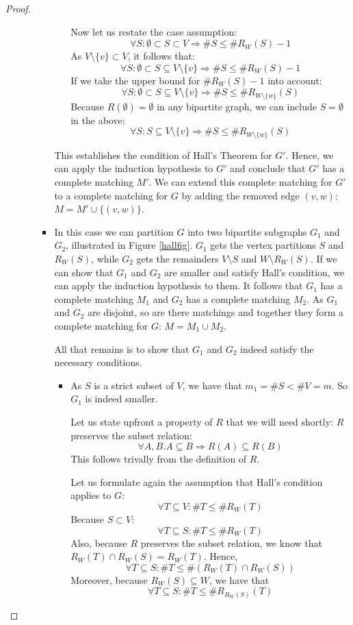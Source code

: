 \begin{proof}
\begin{itemize}
\begin{itemize}
\begin{itemize}
\begin{itemize}
Now let us restate the case assumption:
\[\forall S: \emptyset \subset S \subset V \Rightarrow \#S \leq \#R_W(S) - 1\]
As $V \setminus \{ v \} \subset V$, it follows that:
\[\forall S: \emptyset \subset S \subseteq V\setminus \{ v \} \Rightarrow \#S \leq \#R_W(S) - 1\]
If we take the upper bound for $\#R_W(S) - 1$ into account:
\[\forall S: \emptyset \subset S \subseteq V\setminus \{ v \} \Rightarrow \#S \leq \#R_{W\setminus\{w\}}(S)\]
Because $R(\emptyset) = \emptyset$ in any bipartite graph, we can include $S = \emptyset$ in the above:
\[\forall S: S \subseteq V\setminus \{ v \} \Rightarrow \#S \leq \#R_{W\setminus\{w\}}(S)\]
\end{itemize}
This establishes the condition of Hall's Theorem for $G'$. Hence, we can apply the induction
hypothesis to $G'$ and conclude that $G'$ has a complete matching $M'$. We can extend
this complete matching for $G'$ to a complete matching for $G$ by adding the removed edge $(v,w)$:
$M = M' \cup \{ (v,w)\}$.
 
\item[\dashuline{$\exists S: \emptyset \subset S \subset V \wedge \#S =\#R(S)$:}]
In this case we can partition $G$ into two bipartite subgraphs $G_1$ and $G_2$,
illustrated in Figure \ref{hallfig}. $G_1$ gets the vertex partitions $S$ and $R_W(S)$, 
while $G_2$ gets the remainders $V \setminus S$ and $W \setminus R_W(S)$.
If we can show that $G_1$ and $G_2$ are smaller and satisfy Hall's condition,
we can apply the induction hypothesis to them. It follows that $G_1$
has a complete matching $M_1$ and $G_2$ has a complete matching $M_2$. As $G_1$ 
and $G_2$ are disjoint, so are there matchings and together they
form a complete matching for $G$: $M = M_1 \cup M_2$.

All that remains is to show that $G_1$ and $G_2$ indeed satisfy the necessary
conditions.
\begin{itemize}
\item[\dotuline{$G_1$:}]
As $S$ is a strict subset of $V$, we have that $m_1 = \#S < \#V = m$.
So $G_1$ is indeed smaller.

Let us state upfront a property of $R$ that we will need shortly:
$R$ preserves the subset relation:
\[ \forall A, B. A \subseteq B \Rightarrow R(A) \subseteq R(B) \]
This follows trivally from the definition of $R$.

Let us formulate again the assumption that Hall's condition applies to $G$:
\[ \forall T \subseteq V: \#T \leq \#R_W(T) \]
Because $S \subset V$:
\[ \forall T \subseteq S: \#T \leq \#R_W(T) \]
Also, because $R$ preserves the subset relation, 
we know that $R_W(T) \cap R_W(S) = R_W(T)$. Hence,
\[ \forall T \subseteq S: \#T \leq \#(R_W(T) \cap R_W(S)) \]
Moreover, because $R_W(S) \subseteq W$, we have that
\[ \forall T \subseteq S: \#T \leq \#R_{R_W(S)}(T) \]


\end{itemize}
\end{itemize}
\end{itemize}
\end{itemize}
\end{proof}
